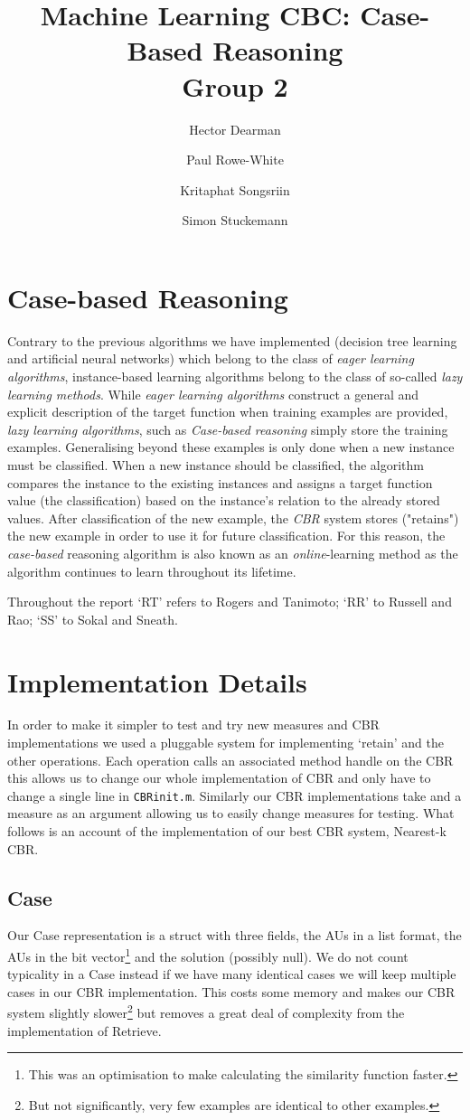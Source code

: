 \documentclass[10pt,a4paper]{article}
\author{Hector Dearman \and Paul Rowe-White \and Kritaphat Songsriin \and Simon Stuckemann}
\title{Machine Learning CBC: Case-Based Reasoning\\Group 2}
\begin{document}
\maketitle

\section{Case-based Reasoning}
Contrary to the previous algorithms we have implemented (decision tree learning and artificial neural networks) which belong to the class of \emph{eager learning algorithms}, instance-based learning algorithms belong to the class  of so-called \emph{lazy learning methods}.
While \emph{eager learning algorithms} construct a general and explicit description of the target function when training examples are provided, \emph{lazy learning algorithms}, such as \emph{Case-based reasoning} simply store the training examples. Generalising beyond these examples is only done when a new instance must be classified. When a new instance should be classified, the algorithm compares the instance to the existing instances and assigns a target function value (the classification) based on the instance's relation to the already stored values. After classification of the new example, the \emph{CBR} system stores ("retains") the new example in order to use it for future classification. For this reason, the \emph{case-based} reasoning algorithm is also known as an \emph{online}-learning method as the algorithm continues to learn throughout its lifetime.

Throughout the report `RT' refers to Rogers and Tanimoto; `RR' to Russell and Rao; `SS' to Sokal and Sneath.

\section{Implementation Details}
In order to make it simpler to test and try new measures and CBR implementations
we used a pluggable system for implementing `retain' and the other operations.
Each operation calls an associated method handle on the CBR this allows us to change our whole implementation of CBR
and only have to change a single line in {\tt CBRinit.m}.
Similarly our CBR implementations take and a measure as an argument allowing us to easily change measures for testing.
What follows is an account of the implementation of our best CBR system, Nearest-k CBR.

\subsection{Case}
Our Case representation is a struct with three fields, the AUs in a list format,
the AUs in the bit vector\footnote{This was an optimisation to make calculating the similarity function faster.} and the solution (possibly null).
We do not count typicality in a Case instead if we have many identical cases we will keep multiple cases in our CBR implementation.
This costs some memory and makes our CBR system slightly slower\footnote{But not significantly, very few examples are identical to other examples.} but removes a great deal of complexity from the implementation of Retrieve.
\end{document}
